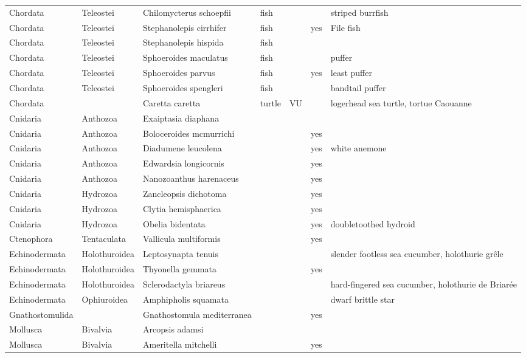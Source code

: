 \begin{longtable}{lllllll}
  Chordata & Teleostei & Chilomycterus schoepfii & fish &  &  & striped burrfish \\ 
  Chordata & Teleostei & Stephanolepis cirrhifer & fish &  & yes & File fish \\ 
  Chordata & Teleostei & Stephanolepis hispida & fish &  &  &  \\ 
  Chordata & Teleostei & Sphoeroides maculatus & fish &  &  & puffer \\ 
  Chordata & Teleostei & Sphoeroides parvus & fish &  & yes & least puffer \\ 
  Chordata & Teleostei & Sphoeroides spengleri & fish &  &  & bandtail puffer \\ 
  Chordata &  & Caretta caretta & turtle & VU &  & logerhead sea turtle, tortue Caouanne \\ 
  Cnidaria & Anthozoa & Exaiptasia diaphana &  &  &  &  \\ 
  Cnidaria & Anthozoa & Boloceroides mcmurrichi &  &  & yes &  \\ 
  Cnidaria & Anthozoa & Diadumene leucolena &  &  & yes & white anemone \\ 
  Cnidaria & Anthozoa & Edwardsia longicornis &  &  & yes &  \\ 
  Cnidaria & Anthozoa & Nanozoanthus harenaceus &  &  & yes &  \\ 
  Cnidaria & Hydrozoa & Zancleopsis dichotoma &  &  & yes &  \\ 
  Cnidaria & Hydrozoa & Clytia hemisphaerica &  &  & yes &  \\ 
  Cnidaria & Hydrozoa & Obelia bidentata &  &  & yes & doubletoothed hydroid \\ 
  Ctenophora & Tentaculata & Vallicula multiformis &  &  & yes &  \\ 
  Echinodermata & Holothuroidea & Leptosynapta tenuis &  &  &  & slender footless sea cucumber, holothurie grêle \\ 
  Echinodermata & Holothuroidea & Thyonella gemmata &  &  & yes &  \\ 
  Echinodermata & Holothuroidea & Sclerodactyla briareus &  &  &  & hard-fingered sea cucumber, holothurie de Briarée \\ 
  Echinodermata & Ophiuroidea & Amphipholis squamata &  &  &  & dwarf brittle star \\ 
  Gnathostomulida &  & Gnathostomula mediterranea &  &  & yes &  \\ 
  Mollusca & Bivalvia & Arcopsis adamsi &  &  &  &  \\ 
  Mollusca & Bivalvia & Ameritella mitchelli &  &  & yes &  \\ 

\end{longtable}
